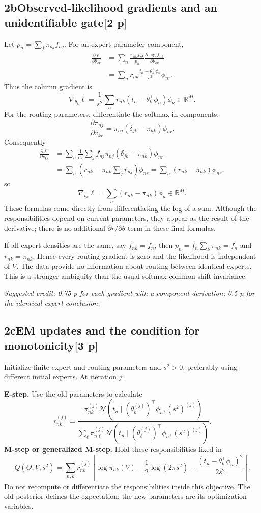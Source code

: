 \documentclass[11pt,a4paper]{article}
\newcommand{\R}{\mathbb R}
\newcommand{\solution}[3]{\Needspace{6\baselineskip}\subsection*{\color{examblue}#1\quad #2\hfill\normalsize[#3 p]}}
\newcommand{\selfcredit}[1]{\par\textit{Suggested credit: #1}\par}
\begin{document}
\solution{2b}{Observed-likelihood gradients and an unidentifiable gate}{2}
Let $p_n=\sum_j\pi_{nj}f_{nj}$. For an expert parameter component,
\begin{align*}
\frac{\partial\ell}{\partial\theta_{kr}}
&=\sum_n\frac{\pi_{nk}f_{nk}}{p_n}
\frac{\partial\log f_{nk}}{\partial\theta_{kr}}\\
&=\sum_nr_{nk}\frac{t_n-\theta_k^\top\phi_n}{s^2}\phi_{nr}.
\end{align*}
Thus the column gradient is
\[
\boxed{\nabla_{\theta_k}\ell
=\frac1{s^2}\sum_nr_{nk}(t_n-\theta_k^\top\phi_n)\phi_n\in\R^M}.
\]
For the routing parameters, differentiate the softmax in components:
\[
\frac{\partial\pi_{nj}}{\partial v_{kr}}
=\pi_{nj}(\delta_{jk}-\pi_{nk})\phi_{nr}.
\]
Consequently
\begin{align*}
\frac{\partial\ell}{\partial v_{kr}}
&=\sum_n\frac1{p_n}\sum_jf_{nj}\pi_{nj}
(\delta_{jk}-\pi_{nk})\phi_{nr}\\
&=\sum_n\left(r_{nk}-\pi_{nk}\sum_jr_{nj}\right)\phi_{nr}
=\sum_n(r_{nk}-\pi_{nk})\phi_{nr},
\end{align*}
so
\[
\boxed{\nabla_{v_k}\ell=\sum_n(r_{nk}-\pi_{nk})\phi_n\in\R^M}.
\]
These formulas come directly from differentiating the log of a sum. Although
the responsibilities depend on current parameters, they appear as the result
of the derivative; there is no additional $\partial r/\partial\theta$ term in
these final formulas.

If all expert densities are the same, say $f_{nk}=f_n$, then
$p_n=f_n\sum_k\pi_{nk}=f_n$ and $r_{nk}=\pi_{nk}$. Hence every routing
gradient is zero and the likelihood is independent of $V$. The data provide
no information about routing between identical experts. This is a stronger
ambiguity than the usual softmax common-shift invariance.
\selfcredit{0.75 p for each gradient with a component derivation; 0.5 p for the identical-expert conclusion.}

\solution{2c}{EM updates and the condition for monotonicity}{3}
Initialize finite expert and routing parameters and $s^2>0$, preferably using
different initial experts. At iteration $j$:

\textbf{E-step.} Use the old parameters to calculate
\[
r_{nk}^{(j)}=
\frac{\pi_{nk}^{(j)}\mathcal N(t_n\mid(\theta_k^{(j)})^\top\phi_n,(s^2)^{(j)})}
{\sum_\ell\pi_{n\ell}^{(j)}\mathcal N(t_n\mid(\theta_\ell^{(j)})^\top\phi_n,(s^2)^{(j)})}.
\]
\textbf{M-step or generalized M-step.} Hold these responsibilities fixed in
\[
Q(\Theta,V,s^2)=\sum_{n,k}r_{nk}^{(j)}\left[
\log\pi_{nk}(V)-\frac12\log(2\pi s^2)
-\frac{(t_n-\theta_k^\top\phi_n)^2}{2s^2}\right].
\]
Do not recompute or differentiate the responsibilities inside this objective.
The old posterior defines the expectation; the new parameters are its
optimization variables.
\end{document}
